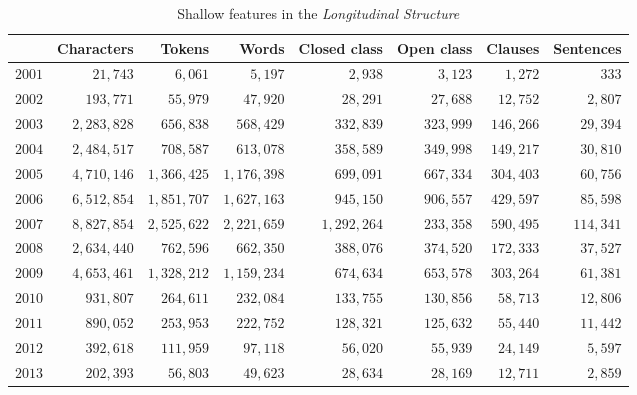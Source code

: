 \begin{table}[htb]
\centering
\small
\begin{tabular}{lrrrrrrr}
\toprule
{} &  Characters &   Tokens &    Words &  Closed class &  Open class &  Clauses &  Sentences \\
\midrule
$2001$ &    $   21,743$ &  $   6,061  $ &  $    5,197   $ &    $    2,938$  &   $     3,123$ &   $  1,272$ &  $   333 $  \\
$2002$ &    $  193,771$ &  $  55,979  $ &  $   47,920   $ &    $   28,291$  &   $    27,688$ &   $ 12,752$ &  $  2,807$  \\
$2003$ &    $ 2,283,828$ & $ 656,838  $ &  $  568,429   $ &    $  332,839$  &   $   323,999$ &   $146,266$ &  $ 29,394$  \\
$2004$ &    $ 2,484,517$ & $ 708,587  $ &  $  613,078   $ &    $  358,589$  &   $   349,998$ &   $149,217$ &  $ 30,810$  \\
$2005$ &    $ 4,710,146$ & $1,366,425 $ &  $  1,176,398  $ &    $   699,091$  &   $   667,334$ &   $304,403$ &  $ 60,756$  \\
$2006$ &    $ 6,512,854$ & $1,851,707 $ &  $  1,627,163  $ &    $   945,150$  &   $   906,557$ &   $429,597$ &  $ 85,598$  \\
$2007$ &    $ 8,827,854$ & $2,525,622 $ &  $  2,221,659  $ &    $  1,292,264$  &   $   233,358$ &   $590,495$ &  $114,341$  \\
$2008$ &    $ 2,634,440$ & $ 762,596  $ &  $  662,350   $ &    $  388,076$  &   $   374,520$ &   $172,333$ &  $ 37,527$  \\
$2009$ &    $ 4,653,461$ & $1,328,212 $ &  $  1,159,234  $ &    $   674,634$  &   $   653,578$ &   $303,264$ &  $ 61,381$  \\
$2010$ &    $  931,807$ &  $ 264,611  $ &  $  232,084   $ &    $  133,755$  &   $   130,856$ &   $ 58,713$ &  $ 12,806$  \\
$2011$ &    $  890,052$ &  $ 253,953  $ &  $  222,752   $ &    $  128,321$  &   $   125,632$ &   $ 55,440$ &  $ 11,442$  \\
$2012$ &    $  392,618$ &  $ 111,959  $ &  $   97,118   $ &    $   56,020$  &   $    55,939$ &   $ 24,149$ &  $  5,597$  \\
$2013$ &    $  202,393$ &  $  56,803  $ &  $   49,623   $ &    $   28,634$  &   $    28,169$ &   $ 12,711$ &  $  2,859$  \\
\bottomrule
\end{tabular}
\caption{Shallow features in the \emph{Longitudinal Structure}}
\label{tab:shallow_L}
\end{table}

